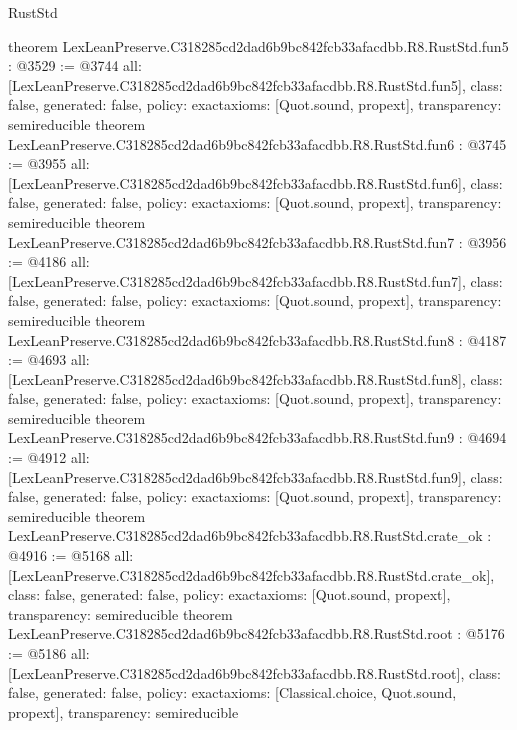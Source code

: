 \begin{lexlean}{RustStd}
\begin{coremodule}
{}
theorem LexLeanPreserve.C318285cd2dad6b9bc842fcb33afacdbb.R8.RustStd.fun5 : @3529 := @3744 {
  all: [LexLeanPreserve.C318285cd2dad6b9bc842fcb33afacdbb.R8.RustStd.fun5],
  class: false,
  generated: false,
  policy: exact{axioms: [Quot.sound, propext]},
  transparency: semireducible
}
theorem LexLeanPreserve.C318285cd2dad6b9bc842fcb33afacdbb.R8.RustStd.fun6 : @3745 := @3955 {
  all: [LexLeanPreserve.C318285cd2dad6b9bc842fcb33afacdbb.R8.RustStd.fun6],
  class: false,
  generated: false,
  policy: exact{axioms: [Quot.sound, propext]},
  transparency: semireducible
}
theorem LexLeanPreserve.C318285cd2dad6b9bc842fcb33afacdbb.R8.RustStd.fun7 : @3956 := @4186 {
  all: [LexLeanPreserve.C318285cd2dad6b9bc842fcb33afacdbb.R8.RustStd.fun7],
  class: false,
  generated: false,
  policy: exact{axioms: [Quot.sound, propext]},
  transparency: semireducible
}
theorem LexLeanPreserve.C318285cd2dad6b9bc842fcb33afacdbb.R8.RustStd.fun8 : @4187 := @4693 {
  all: [LexLeanPreserve.C318285cd2dad6b9bc842fcb33afacdbb.R8.RustStd.fun8],
  class: false,
  generated: false,
  policy: exact{axioms: [Quot.sound, propext]},
  transparency: semireducible
}
theorem LexLeanPreserve.C318285cd2dad6b9bc842fcb33afacdbb.R8.RustStd.fun9 : @4694 := @4912 {
  all: [LexLeanPreserve.C318285cd2dad6b9bc842fcb33afacdbb.R8.RustStd.fun9],
  class: false,
  generated: false,
  policy: exact{axioms: [Quot.sound, propext]},
  transparency: semireducible
}
theorem LexLeanPreserve.C318285cd2dad6b9bc842fcb33afacdbb.R8.RustStd.crate_ok : @4916 := @5168 {
  all: [LexLeanPreserve.C318285cd2dad6b9bc842fcb33afacdbb.R8.RustStd.crate_ok],
  class: false,
  generated: false,
  policy: exact{axioms: [Quot.sound, propext]},
  transparency: semireducible
}
theorem LexLeanPreserve.C318285cd2dad6b9bc842fcb33afacdbb.R8.RustStd.root : @5176 := @5186 {
  all: [LexLeanPreserve.C318285cd2dad6b9bc842fcb33afacdbb.R8.RustStd.root],
  class: false,
  generated: false,
  policy: exact{axioms: [Classical.choice, Quot.sound, propext]},
  transparency: semireducible
}


\end{coremodule}
\end{lexlean}
